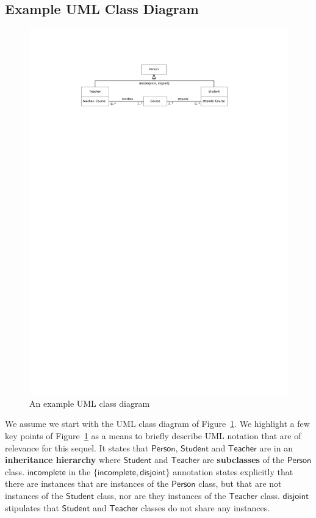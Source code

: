 \documentclass{amsart}
\begin{document}
   \subsection{Example UML Class Diagram} \label{subsec_ArmstrongABoxesAppliedToUML}
    \begin{figure}
    \centering \includegraphics[trim = 40mm 230mm 45mm 25mm, clip, scale=0.9]{./UniversityClassDiagram0Simplified.pdf}
    \caption{An example UML class diagram}\label{fig_UniversityClassDiagram0}
    \end{figure}  
   
   
   We assume we start with the UML class diagram of Figure~\ref{fig_UniversityClassDiagram0}.
   We highlight a few key points of  Figure~\ref{fig_UniversityClassDiagram0} as a means to briefly describe UML notation that are of relevance for this sequel.   It states that $\mathsf{Person}$, $\mathsf{Student}$ and $\mathsf{Teacher}$ are in an \textbf{inheritance hierarchy} where $\mathsf{Student}$ and $\mathsf{Teacher}$ are \textbf{subclasses} of the $\mathsf{Person}$ class. $\mathsf{incomplete}$ in the $\{\mathsf{incomplete, disjoint}\}$ annotation states explicitly that there are instances that are instances of  the $\mathsf{Person}$ class, but that are not instances of the $\mathsf{Student}$ class, nor are they instances of the $\mathsf{Teacher}$ class. $\mathsf{disjoint}$ stipulates that $\mathsf{Student}$ and $\mathsf{Teacher}$ classes  do not share any instances. 
\end{document}
